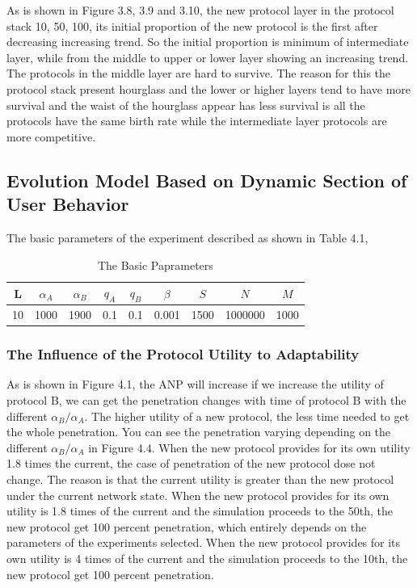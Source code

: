 \documentclass{article}
\begin{document}
As is shown in Figure 3.8, 3.9 and 3.10, the new protocol layer in the protocol stack 10, 50, 100, its initial proportion
of the new protocol is the first after decreasing increasing trend. So the initial proportion is minimum of intermediate
layer, while from the middle to upper or lower layer showing an increasing trend. The protocols in the
middle layer are hard to survive. The reason for this the protocol stack present hourglass and the lower or 
higher layers tend to have more survival and the waist of the hourglass appear has less survival is all the protocols have 
the same birth rate while the intermediate layer protocols are more competitive. 

\subsection{Evolution Model Based on Dynamic Section of User Behavior}
The basic parameters of the experiment described as shown in Table 4.1,
\renewcommand\arraystretch{1.2}
\begin{table}%
  \centering
  \caption{The Basic Paprameters}\label{tab:tab1}
  \begin{tabular}{ccccccccc}
  \hline
  L & $\alpha_A$ & $\alpha_B$ & $q_A$ & $q_B$ &$\beta$ & $S$ & $N$ & $M$ \\
  \hline
  10 & 1000 & 1900 & 0.1 & 0.1 & 0.001 & 1500 & 1000000 & 1000 \\
  \hline
\end{tabular}

\end{table}

\subsubsection{The Influence of the Protocol Utility to Adaptability}
As is shown in Figure 4.1, the ANP will increase if we increase the utility of protocol B, we can get the penetration
changes with time of protocol B with the different $\alpha_{B}/\alpha_{A}$. The higher utility of a new protocol, the
less time needed to get the whole penetration. You can see the penetration varying depending on the different
$\alpha_{B}/\alpha_{A}$ in Figure 4.4. When the new protocol provides for its own utility 1.8 times the current, the
case of penetration of the new protocol dose not change. The reason is that the current utility is greater than the
new protocol under the current network state. When the new protocol provides for its own utility is 1.8 times of the
current and the simulation proceeds to the 50th,  the new protocol get 100 percent penetration, which entirely depends
on the parameters of the experiments selected. When the new protocol provides for its own utility is 4 times of the
current and the simulation proceeds to the 10th, the new protocol get 100 percent penetration.
\end{document}
